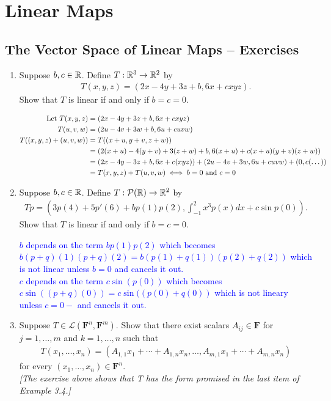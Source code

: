 \documentclass[10pt,a4paper]{report}
\newcommand{\BLUE}[1]{\textcolor{blue}{#1}}
\newcommand{\F}{\textbf{F}}
\begin{document}
\chapter{Linear Maps}

\section{The Vector Space of Linear Maps -- Exercises}
\newcommand{\LL}{\mathcal{L}}

\begin{enumerate}
\item Suppose $b,c \in \mathbb{R}$. Define $T:\mathbb{R}^3\to\mathbb{R}^2$ by 
\begin{align*}
	T(x,y,z)=(2x-4y+3z+b, 6x+cxyz).
\end{align*}Show that $T$ is linear if and only if $b=c=0$.

\BLUE{\begin{align*}
	\text{Let } T(x,y,z)&=(2x-4y+3z+b, 6x+cxyz) \\
		T(u,v,w)&=(2u-4v+3w+b, 6u+cuvw)\\
		T((x,y,z)+(u,v,w))&=T((x+u,y+v,z+w))\\
		&=(2(x+u)-4(y+v)+3(z+w)+b, 6(x+u)+c(x+u)(y+v)(z+w)) \\
		&=(2x-4y-3z+b, 6x+c(xyz))+(2u-4v+3w, 6u+cuvw)+(0, c(\dots)) \\
		&= T(x,y,z)+T(u,v,w) \iff b=0 \text{ and } c=0
\end{align*}
}

\item Suppose $b,c \in \mathbb{R}$.  Define $T:\mathcal{P}(\mathbb{R})\to\mathbb{R}^2$ by 
\begin{align*}
	Tp=(3p(4)+5p'(6)+bp(1)p(2), \int_{-1}^2 x^3p(x)dx+c\sin p(0)).
\end{align*}Show that $T$ is linear if and only if $b=c=0$.

\BLUE{$b$ depends on the term $bp(1)p(2)$ which becomes $b(p+q)(1)(p+q)(2) = b(p(1)+q(1))(p(2)+q(2))$ which is not linear unless $b=0$ and cancels it out.\\
$c$ depends on the term $c\sin(p(0))$ which becomes $c\sin((p+q)(0))=c\sin((p(0)+q(0))$ which is not lineary unless $c = 0-$ and cancels it out.
}

\item Suppose $T \in \LL(\F^n,\F^m)$.  Show that there exist scalars $A_{ij} \in \F$ for $j=1,\dots,m$ and $k=1,\dots,n$ such that 
\begin{align*}
	T(x_1,\dots,x_n)=(A_{1,1}x_1+\cdots+A_{1,n}x_n,\dots,A_{m,1}x_1+\cdots+A_{m,n}x_n)
\end{align*}for every $(x_1,\dots,x_n) \in \F^n$.\\
\textit{[The exercise above shows that T has the form promised in the last item of Example 3.4.]}


\end{enumerate}
\end{document}
